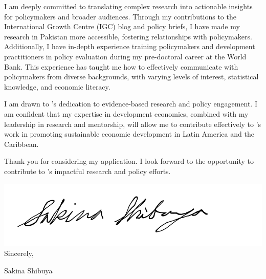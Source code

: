 \documentclass[12pt]{letter}
\begin{document}
I am deeply committed to translating complex research into actionable insights for policymakers and broader audiences. 
Through my contributions to the International Growth Centre (IGC) blog and policy briefs, I have made my research in Pakistan more accessible, 
fostering relationships with policymakers. Additionally, I have in-depth experience training policymakers and development practitioners 
in policy evaluation during my pre-doctoral career at the World Bank. This experience has taught me how to effectively communicate 
with policymakers from diverse backgrounds, with varying levels of interest, statistical knowledge, and economic literacy.

I am drawn to \instName's dedication to evidence-based research and policy engagement. I am confident that my expertise 
in development economics, combined with my leadership in research and mentorship, will allow me to contribute effectively 
to \instName's work in promoting sustainable economic development in Latin America and the Caribbean.

Thank you for considering my application. I look forward to the opportunity to contribute to \instName's 
impactful research and policy efforts.

\bigskip

\includegraphics[height=4\baselineskip]{signature.png}  \\

\vspace*{-6.5\baselineskip}Sincerely, 

\vspace{2.5\baselineskip}Sakina Shibuya
\end{document}
